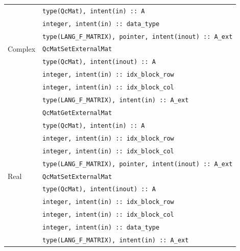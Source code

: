 \documentclass[a4paper,11pt,twoside,openright]{book}
\begin{document}
\begin{center}
\begin{longtable}{p{}|l}
    & \hspace*{2ex}\verb|type(QcMat), intent(in) :: A|\\
    & \hspace*{2ex}\verb|integer, intent(in) :: data_type|\\
    & \hspace*{2ex}\verb|type(LANG_F_MATRIX), pointer, intent(inout) :: A_ext|\\
    \hline
    Complex & \verb|QcMatSetExternalMat|\\
    & \hspace*{2ex}\verb|type(QcMat), intent(inout) :: A|\\
    & \hspace*{2ex}\verb|integer, intent(in) :: idx_block_row|\\
    & \hspace*{2ex}\verb|integer, intent(in) :: idx_block_col|\\
    & \hspace*{2ex}\verb|type(LANG_F_MATRIX), intent(in) :: A_ext|\\
    \cline{2-2}
    & \verb|QcMatGetExternalMat|\\
    & \hspace*{2ex}\verb|type(QcMat), intent(in) :: A|\\
    & \hspace*{2ex}\verb|integer, intent(in) :: idx_block_row|\\
    & \hspace*{2ex}\verb|integer, intent(in) :: idx_block_col|\\
    & \hspace*{2ex}\verb|type(LANG_F_MATRIX), pointer, intent(inout) :: A_ext|\\
    \hline
    Real & \verb|QcMatSetExternalMat|\\
    & \hspace*{2ex}\verb|type(QcMat), intent(inout) :: A|\\
    & \hspace*{2ex}\verb|integer, intent(in) :: idx_block_row|\\
    & \hspace*{2ex}\verb|integer, intent(in) :: idx_block_col|\\
    & \hspace*{2ex}\verb|integer, intent(in) :: data_type|\\
    & \hspace*{2ex}\verb|type(LANG_F_MATRIX), intent(in) :: A_ext|\\

\end{longtable}
\end{center}
\end{document}
